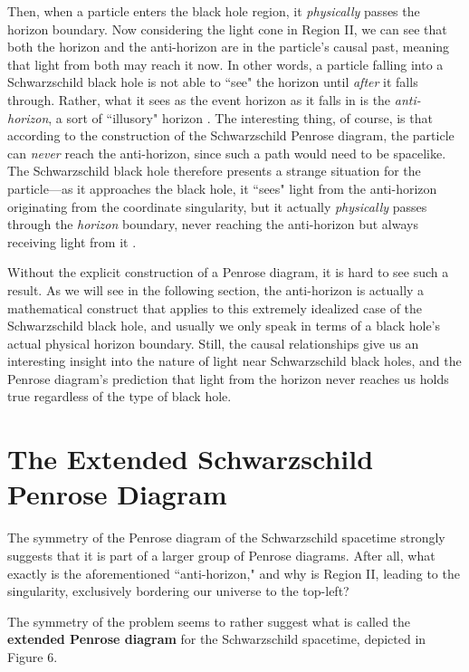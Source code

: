 \documentclass{article}
\begin{document}
Then, when a particle enters the black hole region, it \textit{physically} passes the horizon boundary. Now considering the light cone in Region II, we can see that both the horizon and the anti-horizon are in the particle's causal past, meaning that light from both may reach it now. In other words, a particle falling into a Schwarzschild black hole is not able to ``see" the horizon until \textit{after} it falls through. Rather, what it sees as the event horizon as it falls in is the \textit{anti-horizon}, a sort of ``illusory" horizon \cite{penrose_colorado}. The interesting thing, of course, is that according to the construction of the Schwarzschild Penrose diagram, the particle can \textit{never} reach the anti-horizon, since such a path would need to be spacelike. The Schwarzschild black hole therefore presents a strange situation for the particle---as it approaches the black hole, it ``sees" light from the anti-horizon originating from the coordinate singularity, but it actually \textit{physically} passes through the \textit{horizon} boundary, never reaching the anti-horizon but always receiving light from it \cite{penrose_colorado}.

Without the explicit construction of a Penrose diagram, it is hard to see such a result. As we will see in the following section, the anti-horizon is actually a mathematical construct that applies to this extremely idealized case of the Schwarzschild black hole, and usually we only speak in terms of a black hole's actual physical horizon boundary. Still, the causal relationships give us an interesting insight into the nature of light near Schwarzschild black holes, and the Penrose diagram's prediction that light from the horizon never reaches us holds true regardless of the type of black hole.


\section{The Extended Schwarzschild Penrose Diagram}

The symmetry of the Penrose diagram of the Schwarzschild spacetime strongly suggests that it is part of a larger group of Penrose diagrams. After all, what exactly is the aforementioned ``anti-horizon," and why is Region II, leading to the singularity, exclusively bordering our universe to the top-left? 

The symmetry of the problem seems to rather suggest what is called the \textbf{extended Penrose diagram} for the Schwarzschild spacetime, depicted in Figure 6.
\end{document}
